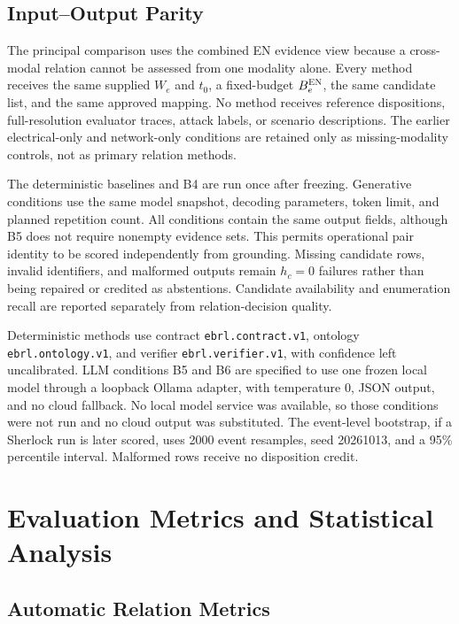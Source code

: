 \documentclass[conference]{IEEEtran}
\newcommand{\EN}{\textsc{EN}}
\begin{document}
\subsection{Input--Output Parity}

The principal comparison uses the combined \EN{} evidence view because a cross-modal relation cannot be assessed from one modality alone. Every method receives the same supplied $W_e$ and $t_0$, a fixed-budget $B_e^{\EN}$, the same candidate list, and the same approved mapping. No method receives reference dispositions, full-resolution evaluator traces, attack labels, or scenario descriptions. The earlier electrical-only and network-only conditions are retained only as missing-modality controls, not as primary relation methods.

The deterministic baselines and B4 are run once after freezing. Generative conditions use the same model snapshot, decoding parameters, token limit, and planned repetition count. All conditions contain the same output fields, although B5 does not require nonempty evidence sets. This permits operational pair identity to be scored independently from grounding. Missing candidate rows, invalid identifiers, and malformed outputs remain $h_c=0$ failures rather than being repaired or credited as abstentions. Candidate availability and enumeration recall are reported separately from relation-decision quality.

Deterministic methods use contract \texttt{ebrl.contract.v1}, ontology \texttt{ebrl.ontology.v1}, and verifier \texttt{ebrl.verifier.v1}, with confidence left uncalibrated. LLM conditions B5 and B6 are specified to use one frozen local model through a loopback Ollama adapter, with temperature 0, JSON output, and no cloud fallback. No local model service was available, so those conditions were not run and no cloud output was substituted. The event-level bootstrap, if a Sherlock run is later scored, uses 2000 event resamples, seed 20261013, and a 95\% percentile interval. Malformed rows receive no disposition credit.

\FloatBarrier
\section{Evaluation Metrics and Statistical Analysis}

\subsection{Automatic Relation Metrics}
\end{document}
